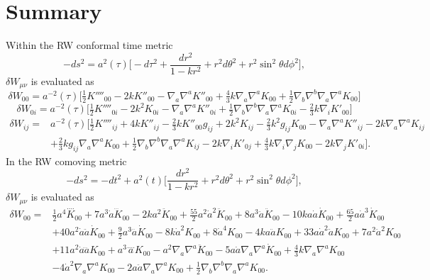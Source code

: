 \documentclass[10pt,letterpaper]{article}
\begin{document}
\section*{Summary}
Within the RW conformal time metric
\begin{equation}
	-ds^2 = a^2(\tau)\bigg[-d\tau^2 + \frac{dr^2}{1-kr^2}+ r^2d\theta^2 + r^2\sin^2\theta d\phi^2\bigg],
\end{equation}
$\delta W_{\mu\nu}$ is evaluated as
\begin{equation}
\delta W_{00}=a^{-2}(\tau)\big[\tfrac{1}{2} K''''_{00} - 2 k K''_{00} -  \nabla_{a}\nabla^{a}K''_{00} + \tfrac{4}{3} k \nabla_{a}\nabla^{a}K_{00} + \tfrac{1}{2} \nabla_{b}\nabla^{b}\nabla_{a}\nabla^{a}K_{00}\big]
\end{equation}
\begin{equation}
\delta W_{0i}=a^{-2}(\tau)\big[\tfrac{1}{2} K''''_{0i} - 2 k^2 K_{0i} -  \nabla_{a}\nabla^{a}K''_{0i} + \tfrac{1}{2} \nabla_{b}\nabla^{b}\nabla_{a}\nabla^{a}K_{0i} -  \tfrac{2}{3} k \nabla_{i}K'_{00}\big]
\end{equation}
\begin{align}
\delta W_{ij}={}&a^{-2}(\tau)\big[\tfrac{1}{2} K''''_{ij}
 + 4 k K''_{ij}
 -  \tfrac{2}{3} k K''_{00} g_{ij}
 + 2 k^2 K_{ij}
 -  \tfrac{2}{3} k^2 g_{ij} K_{00}
 -  \nabla_{a}\nabla^{a}K''_{ij}
 - 2 k \nabla_{a}\nabla^{a}K_{ij}\nonumber\\
& + \tfrac{2}{3} k g_{ij} \nabla_{a}\nabla^{a}K_{00}
 + \tfrac{1}{2} \nabla_{b}\nabla^{b}\nabla_{a}\nabla^{a}K_{ij}
 - 2 k \nabla_{i}K'_{0j}
 + \tfrac{4}{3} k \nabla_{i}\nabla_{j}K_{00}
 - 2 k \nabla_{j}K'_{0i}\big].
\end{align}
In the RW comoving metric
\begin{equation}
	-ds^2 = -dt^2 + a^2(t)\bigg[\frac{dr^2}{1-kr^2}+ r^2d\theta^2 + r^2\sin^2\theta d\phi^2\bigg],
\end{equation}
$\delta W_{\mu\nu}$ is evaluated as
\begin{align}
\delta W_{00}={}&\tfrac{1}{2} a^4 \overset{\text{...}.}{K}_{00}
 + 7 a^3 \dot{a} \dddot{K}_{00}
 - 2 k a^2 \ddot{K}_{00}
 + \tfrac{55}{2} a^2 \dot{a}^2 \ddot{K}_{00}
 + 8 a^3 \ddot{a} \ddot{K}_{00}
 - 10 k a \dot{a} \dot{K}_{00}
 + \tfrac{65}{2} a \dot{a}^3 \dot{K}_{00}\nonumber\\
& + 40 a^2 \dot{a} \ddot{a} \dot{K}_{00}
 + \tfrac{9}{2} a^3 \dddot{a} \dot{K}_{00}
 - 8 k \dot{a}^2 K_{00}
 + 8 \dot{a}^4 K_{00}
 - 4 k a \ddot{a} K_{00}
 + 33 a \dot{a}^2 \ddot{a} K_{00}
 + 7 a^2 \ddot{a}^2 K_{00}\nonumber\\
& + 11 a^2 \dot{a} \dddot{a} K_{00}
 + a^3 \overset{\text{...}.}{a} K_{00}
 -  a^2 \nabla_{a}\nabla^{a}\ddot{K}_{00}
 - 5 a \dot{a} \nabla_{a}\nabla^{a}\dot{K}_{00}
 + \tfrac{4}{3} k \nabla_{a}\nabla^{a}K_{00}\nonumber\\
& - 4 \dot{a}^2 \nabla_{a}\nabla^{a}K_{00}
 - 2 a \ddot{a} \nabla_{a}\nabla^{a}K_{00}
 + \tfrac{1}{2} \nabla_{b}\nabla^{b}\nabla_{a}\nabla^{a}K_{00}.
\end{align}
\end{document}
